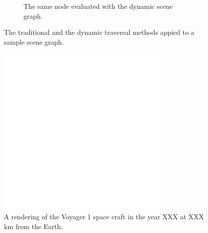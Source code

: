 \begin{figure}
\begin{subfigure}[b]{0.4\textwidth}
    \caption{The same node evaluated with the dynamic scene graph.}
    \label{contributions:astro:dsg:sceengraph:dsg}
\end{subfigure}
\caption{The traditional and the dynamic traversal methods appied to a sample scene graph.}
\label{contributions:astro:dsg:sceengraph}
\end{figure}

\begin{figure}
\centering
\includegraphics[width=0.75\textwidth]{figures/empty.png}
\caption{A rendering of the Voyager 1 space craft in the year XXX at XXX\, km from the Earth.}
\label{contributions:astro:dsg:voyager}
\end{figure}

